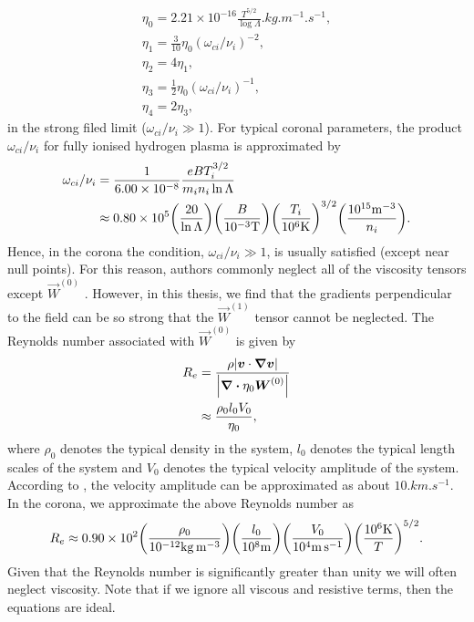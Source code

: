\begin{gather}
    \label{eq:braginskii_eta_0}
    \eta_0=2.21\times10^{-16}\frac{T^{5/2}}{\log \Lambda}\si{.kg.m^{-1}.s^{-1}}, \\
    \label{eq:braginskii_eta_1}
    \eta_1=\frac{3}{10}\eta_0(\omega_{ci}/\nu_i)^{-2}, \\
    \label{eq:braginskii_eta_2}
     \eta_2=4\eta_1,   \\
    \eta_3=\frac{1}{2}\eta_0(\omega_{ci}/\nu_i)^{-1}, \\
    \eta_4=2\eta_3,
\end{gather}
in the strong filed limit ($\omega_{ci}/\nu_i\gg1$). For typical coronal parameters, the product $\omega_{ci}/\nu_i$ for fully ionised hydrogen plasma is approximated by 
\begin{equation}
    \label{eq:proton_gyrofrequency_times_collision_time}
    \begin{aligned}
    \omega_{ci}/\nu_i &= \frac{1}{6.00\times10^{-8}}\frac{eBT_i^{3/2}}{m_in_i\ln\Lambda}\\
    &\approx 0.80\times10^5\qty(\frac{20}{\ln\Lambda})\qty(\frac{B}{10^{-3}\si{.T}})\qty(\frac{T_i}{10^6\si{.K}})^{3/2}\qty(\frac{10^{15}\si{.m^{-3}}}{n_i}).
    \end{aligned}
\end{equation}
Hence, in the corona the condition, $\omega_{ci}/\nu_i\gg1$, is usually satisfied (except near null points). For this reason, authors commonly neglect all of the viscosity tensors except $\vec{W}^{(0)}$ \citep{Hollweg1986b, MacTaggart2017}. However, in this thesis, we find that the gradients perpendicular to the field can be so strong that the $\vec{W}^{(1)}$ tensor cannot be neglected. The Reynolds number associated with $\vec{W}^{(0)}$ is given by
\begin{equation}
    \begin{aligned}
    R_e&=\frac{\rho\abs{\boldsymbol{v}\cdot\grad{\boldsymbol{v}}}}{\abs{\div{\eta_0\boldsymbol{W}^{(0)}}}} \\
    &\approx\frac{\rho_0 l_0V_0}{\eta_0},
    \end{aligned}
\end{equation}
where $\rho_0$ denotes the typical density in the system, $l_0$ denotes the typical length scales of the system and $V_0$ denotes the typical velocity amplitude of the system. According to \citet{McIntosh2011,McIntosh2012}, the velocity amplitude can be approximated as about $10\si{.km.s^{-1}}$. In the corona, we approximate the above Reynolds number as
\begin{equation}
    \label{eq:visc_reynolds_number}
    R_e\approx  0.90\times10^2\qty(\frac{\rho_0}{10^{-12}\si{kg.m^{-3}}})\qty(\frac{l_0}{10^8\si{.m}})\qty(\frac{V_0}{10^4\si{.m.s^{-1}}})\qty(\frac{10^6\si{.K}}{T})^{5/2}.
\end{equation}
Given that the Reynolds number is significantly greater than unity we will often neglect viscosity. Note that if we ignore all viscous and resistive terms, then the equations are ideal.

